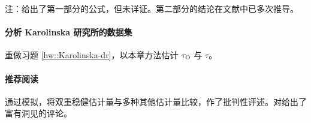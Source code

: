 注：\citet{vansteelandt2021assumption}给出了第一部分的公式，但未详证。第二部分的结论在文献中已多次推导\citep[e.g.,][]{angrist1998estimating, ding2021frisch}。 


\paragraph{分析 Karolinska 研究所的数据集}\label{hw::Karolinska-pscore}

重做习题 \ref{hw::Karolinska-dr}，以本章方法估计 $\tau_\textsc{O}$ 与 $\tau$。 


 
 


 \paragraph{推荐阅读}\citet{kang2007demystifying}通过模拟，将双重稳健估计量与多种其他估计量比较，作了批判性评述。\citet{robins2007comment}对\citet{kang2007demystifying}给出了富有洞见的评论。   
 
 
 


